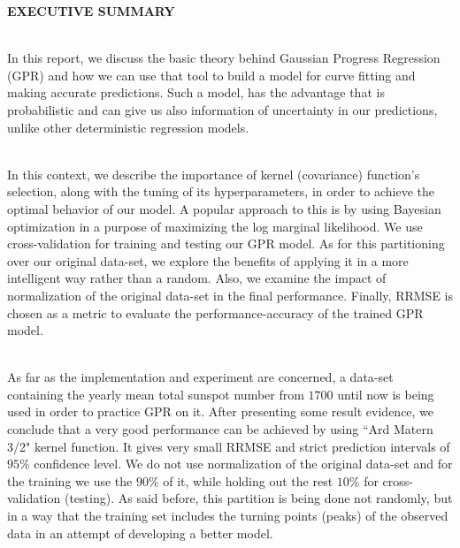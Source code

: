 \documentclass[12pt,a4paper]{article}
\newcommand{\boldmark}[1]{\noindent\textbf{#1}\\ }
\begin{document}

\sectionmark{}
\noindent
\boldmark{\Large{{\color{crimsonglory}EXECUTIVE SUMMARY}}}

\normalsize

\begin{spacing}{1.5}
\noindent
\\In this report, we discuss the basic theory behind Gaussian Progress Regression (GPR) and how we can use that tool to build a model for curve fitting and making accurate predictions. Such a model, has the advantage that is probabilistic and can give us also information of uncertainty in our predictions, unlike other deterministic regression models.

\noindent
\\In this context, we describe the importance of kernel (covariance) function's selection, along with the tuning of its hyperparameters, in order to achieve the optimal behavior of our model. A popular approach to this is by using Bayesian optimization in a purpose of maximizing the log marginal likelihood. We use cross-validation for training and testing our GPR model. As for this partitioning over our original data-set, we explore the benefits of applying it in a more intelligent way rather than a random. Also, we examine the impact of normalization of the original data-set in the final performance. Finally, RRMSE is chosen as a metric to evaluate the performance-accuracy of the trained GPR model.

\noindent
\\As far as the implementation and experiment are concerned, a data-set containing the yearly mean total sunspot number from $1700$ until now is being used in order to practice GPR on it. After presenting some result evidence, we conclude that a very good performance can be achieved by using ``Ard Matern 3/2" kernel function. It gives very small RRMSE and strict prediction intervals of $95\%$ confidence level. We do not use normalization of the original data-set and for the training we use the $90\%$ of it, while holding out the rest $10\%$ for cross-validation (testing). As said before, this partition is being done not randomly, but in a way that the training set includes the turning points (peaks) of the observed data in an attempt of developing a better model.

\end{spacing}

\newpage
\end{document}
